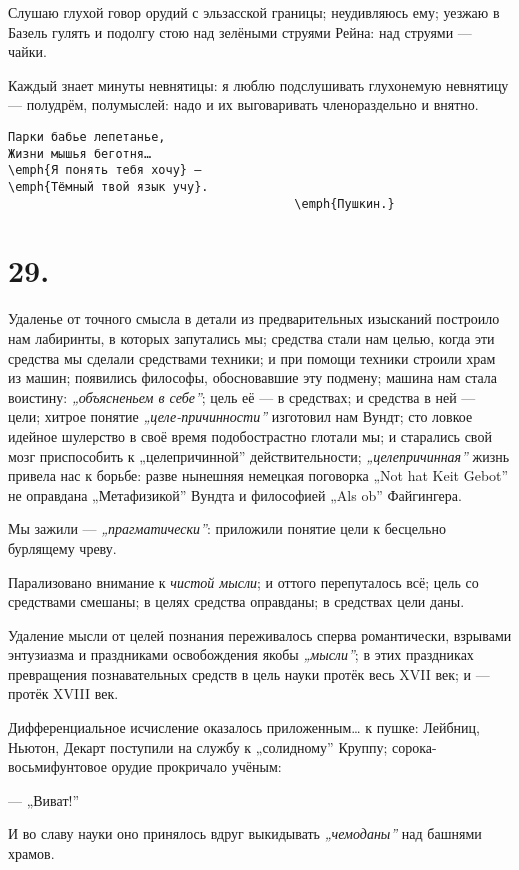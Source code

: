 \documentclass[12pt,a4paper,oneside]{book}
\begin{document}
Слушаю глухой говор орудий с эльзасской границы; неудивляюсь ему; уезжаю в Базель гулять и подолгу стою над зелёными струями Рейна: над струями — чайки.

Каждый знает минуты невнятицы: я люблю подслушивать глухонемую невнятицу — полудрём, полумыслей: надо и их выговаривать членораздельно и внятно.

\begin{Verbatim}
Парки бабье лепетанье,
Жизни мышья беготня…
\emph{Я понять тебя хочу} —
\emph{Тёмный твой язык учу}.
                                        \emph{Пушкин.}
\end{Verbatim}

\section*{29.}

Удаленье от точного смысла в детали из предварительных изысканий построило нам лабиринты, в которых запутались мы; средства стали нам целью, когда эти средства мы сделали средствами техники; и при помощи техники строили храм из машин; появились философы, обосновавшие эту подмену; машина нам стала воистину: \emph{„объясненьем в себе”}; цель её — в средствах; и средства в ней — цели; хитрое понятие \emph{„целе-причинности”} изготовил нам Вундт; сто ловкое идейное шулерство в своё время подобострастно глотали мы; и старались свой мозг приспособить к „целепричинной” действительности; \emph{„целепричинная”} жизнь привела нас к борьбе: разве нынешняя немецкая поговорка „Not hat Keit Gebot” не оправдана „Метафизикой” Вундта и философией „Als ob” Файгингера.

Мы зажили — \emph{„прагматически”}: приложили понятие цели к бесцельно бурлящему чреву.

Парализовано внимание к \emph{чистой мысли}; и оттого перепуталось всё; цель со средствами смешаны; в целях средства оправданы; в средствах цели даны.

Удаление мысли от целей познания переживалось сперва романтически, взрывами энтузиазма и праздниками освобождения якобы \emph{„мысли”}; в этих праздниках превращения познавательных средств в цель науки протёк весь XVII век; и — протёк XVIII век.

Дифференциальное исчисление оказалось приложенным… к пушке: Лейбниц, Ньютон, Декарт поступили на службу к „солидному” Круппу; сорока-восьмифунтовое орудие прокричало учёным:

— „Виват!”

И во славу науки оно принялось вдруг выкидывать \emph{„чемоданы”} над башнями храмов.
\end{document}
